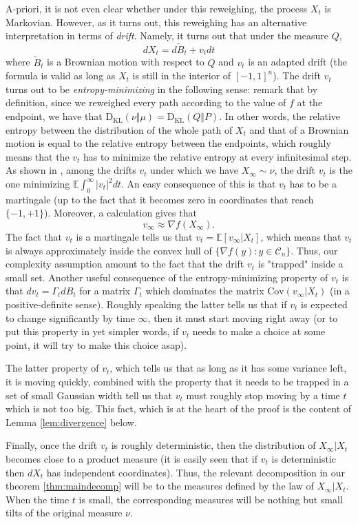\documentclass[12pt]{article}
\def \EE {\mathbb E}
\def \DC {\mathcal{C}_n}
\def \KL {\mathrm{D}_{\mathrm{KL}}}
\theoremstyle{definition}
\theoremstyle{remark}
\begin{document}
A-priori, it is not even clear whether under this reweighing, the process $X_t$ is Markovian. However, as it turns out, this reweighing has an alternative interpretation in terms of \emph{drift}. Namely, it turns out that under the measure $Q$,  
$$
d X_t = d \tilde B_t + v_t dt 
$$ 
where $\tilde B_t$ is a Brownian motion with respect to $Q$ and $v_t$ is an adapted drift (the formula is valid as long as $X_t$ is still in the interior of $[-1,1]^n$). The drift $v_t$ turns out to be \emph{entropy-minimizing} in the following sense: remark that by definition, since we reweighed every path according to the value of $f$ at the endpoint, we have that $\KL(\nu \Vert \mu) = \KL(Q \Vert P)$. In other words, the relative entropy between the distribution of the whole path of $X_t$ and that of a Brownian motion is equal to the relative entropy between the endpoints, which roughly means that the $v_t$ has to minimize the relative entropy at every infinitesimal step. As shown in \cite{Lehec-13}, among the drifts $v_t$ under which we have $X_\infty \sim \nu$, the drift $v_t$ is the one minimizing $\EE \int_0^\infty |v_t|^2 dt$. An easy consequence of this is that $v_t$ has to be a martingale (up to the fact that it becomes zero in coordinates that reach $\{-1,+1\}$). Moreover, a calculation gives that
$$
v_\infty \approx \nabla f(X_\infty).
$$
The fact that $v_t$ is a martingale tells us that $v_t = \EE[v_\infty | X_t]$, which means that $v_t$ is always approximately inside the convex hull of $\{\nabla f(y): y \in \DC \}$. Thus, our complexity assumption amount to the fact that the drift $v_t$ is "trapped" inside a small set. Another useful consequence of the entropy-minimizing property of $v_t$ is that $d v_t = \Gamma_t d B_t$ for a matrix $\Gamma_t$ which dominates the matrix $\mathrm{Cov}(v_\infty | X_t)$ (in a positive-definite sense). Roughly speaking the latter tells us that if $v_t$ is expected to change significantly by time $\infty$, then it must start moving right away (or to put this property in yet simpler words, if $v_t$ needs to make a choice at some point, it will try to make this choice asap).

The latter property of $v_t$, which tells us that as long as it has some variance left, it is moving quickly, combined with the property that it needs to be trapped in a set of small Gaussian width tell us that $v_t$ must roughly stop moving by a time $t$ which is not too big. This fact, which is at the heart of the proof is the content of Lemma \ref{lem:divergence} below. 

Finally, once the drift $v_t$ is roughly deterministic, then the distribution of $X_\infty | X_t$ becomes close to a product measure (it is easily seen that if $v_t$ is deterministic then $d X_t$ has independent coordinates). Thus, the relevant decomposition in our theorem \ref{thm:maindecomp} will be to the measures defined by the law of $X_\infty | X_t$. When the time $t$ is small, the corresponding measures will be nothing but small tilts of the original measure $\nu$.
\end{document}
